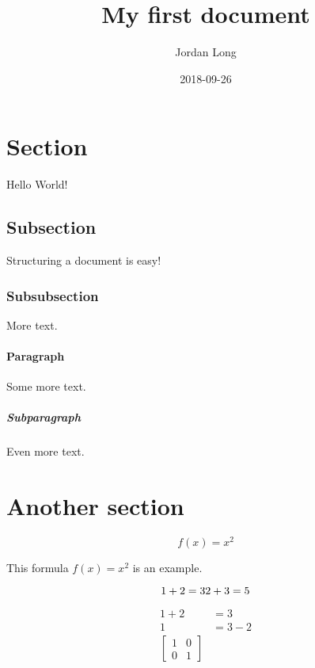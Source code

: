 \documentclass{article}
\title{My first document}
\date{2018-09-26}
\author{Jordan Long}
\begin{document}
\maketitle
\newpage
\tableofcontents
\newpage
{}
	
\section{Section}

Hello World!

\subsection{Subsection}

Structuring a document is easy!

\subsubsection{Subsubsection}

More text.

\paragraph{Paragraph}

Some more text.

\subparagraph{Subparagraph}

Even more text.

\section{Another section}

\begin{equation*}
	f(x) = x^2
\end{equation*}

This formula $f(x) = x^2$ is an example.

\begin{equation*}
1 + 2 = 3\\
2 + 3 = 5
\end{equation*}

\begin{align}
1 + 2 &= 3\\
1 &= 3 - 2\\
\left[
\begin{matrix}
1 & 0\\
0 & 1
\end{matrix}
\right]
\end{align}
\end{document}
